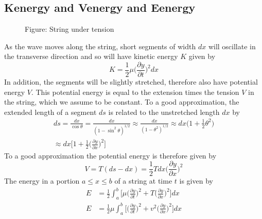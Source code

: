 \documentclass[../../../main.tex]{subfiles}
\begin{document}
\subsection{Kenergy and Venergy and Eenergy} 
\begin{figure*}
    \centering
    \caption*{Figure: String under tension}
\end{figure*}
As the wave moves along the string, short segments of width $dx$ will oscillate in the transverse direction and so will have kinetic energy $K$ given by
\begin{equation*}
    K=\frac{1}{2}\mu \biggl(\frac{\partial y}{\partial t}\biggr)^2 dx 
\end{equation*}
In addition, the segments will be slightly stretched, therefore also have potential energy $V$. This potential energy is equal to the extension times the tension $V$ in the string, which we assume to be constant. To a good approximation, the extended length of a segment $ds$ is related to the unstretched length $dx$ by
\begin{multline*}
    ds=\frac{dx}{\cos \theta}=\frac{dx}{(1-\sin^2\theta)^{1/2}}\approx \frac{dx}{(1-\theta^2)^{1/2}} \approx dx\biggl(1+\frac{1}{2}\theta^2\biggr) \\
    \approx dx\biggl[1+\frac{1}{2}\biggl(\frac{\partial y}{\partial x}\biggr)^2\biggr]
\end{multline*}
To a good approximation the potential energy is therefore given by
\begin{equation*}
    V=T(ds-dx)=\frac{1}{2}Tdx \biggl(\frac{\partial y}{\partial x}\biggr)^2
\end{equation*}
The energy in a portion $a \leq x \leq b$ of a string at time $t$ is given by
\begin{align*}
    E&=\frac{1}{2}\int_{a}^{b}\biggl[\mu \biggl(\frac{\partial y}{\partial t}\biggr)^2 + T \biggl(\frac{\partial y}{\partial x}\biggr)^2\biggr]dx\\
    E&=\frac{1}{2}\mu\int_{a}^{b}\biggl[ \biggl(\frac{\partial y}{\partial t}\biggr)^2 + v^2 \biggl(\frac{\partial y}{\partial x}\biggr)^2\biggr]dx\\
\end{align*}
\end{document}
